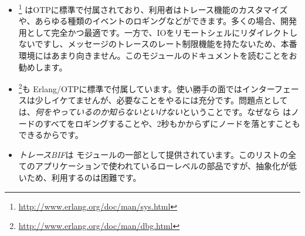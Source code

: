 \begin{itemize}
	\item {}\footnote{\href{http://www.erlang.org/doc/man/sys.html}{http://www.erlang.org/doc/man/sys.html}} はOTPに標準で付属されており、利用者はトレース機能のカスタマイズや、あらゆる種類のイベントのロギングなどができます。多くの場合、開発用として完全かつ最適です。一方で、IOをリモートシェルにリダイレクトしないですし、メッセージのトレースのレート制限機能を持たないため、本番環境にはあまり向きません。このモジュールのドキュメントを読むことをお勧めします。

\item {}\footnote{\href{http://www.erlang.org/doc/man/dbg.html}{http://www.erlang.org/doc/man/dbg.html}}も Erlang/OTPに標準で付属しています。使い勝手の面ではインターフェースは少しイケてませんが、必要なことをやるには充分です。問題点としては、\emph{何をやっているのか知らないといけない}ということです。なぜなら  はノードのすべてをロギングすることや、2秒もかからずにノードを落とすこともできるからです。

	\item \emph{トレースBIF}は モジュールの一部として提供されています。このリストの全てのアプリケーションで使われているローレベルの部品ですが、抽象化が低いため、利用するのは困難です。


\end{itemize}
